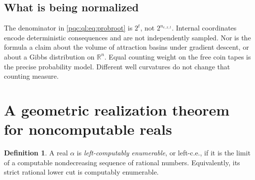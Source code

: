 \documentclass[11pt,letterpaper]{article}
\numberwithin{equation}{section}
\theoremstyle{definition}
\newtheorem{definition}[theorem]{Definition}
\theoremstyle{remark}
\newcommand{\R}{\mathbb R}
\newcommand{\srcmark}[1]{\par\noindent{\small\itshape [source~#1]}\par}
\begin{document}
\subsection{What is being normalized}
The denominator in \eqref{pqc:ql:eq:probroot} is $2^t$, not $2^{n_{e,x,t}}$.
Internal coordinates encode deterministic consequences and are not
independently sampled. Nor is the formula a claim about the volume of
attraction basins under gradient descent, or about a Gibbs distribution on
$\R^n$. Equal counting weight on the free coin tapes is the precise
probability model. Different well curvatures do not change that counting
measure.

\section{A geometric realization theorem for noncomputable reals}\label{pqc:ql:sec:leftce}
\srcmark{13}

\begin{definition}
A real $\alpha$ is \emph{left-computably enumerable}, or left-c.e., if it is
the limit of a computable nondecreasing sequence of rational numbers.
Equivalently, its strict rational lower cut is computably enumerable.
\end{definition}
\end{document}
